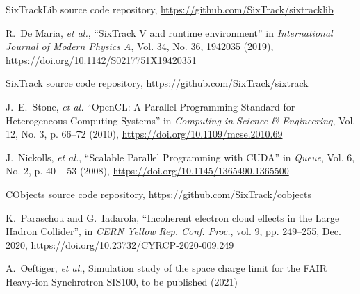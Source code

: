 \documentclass[a4paper,
               refpage,       %
               keeplastbox,   %
               ]{jacow}
\begin{document}

%
%
%
	{\printbibliography}%
	{%
	
	\begin{thebibliography}{99}   %
	
		SixTrackLib source code repository, \newline
		\url{https://github.com/SixTrack/sixtracklib}

        R.~De Maria,  {\it et al.}, ``SixTrack V and runtime environment'' in 
        \textit{International Journal of Modern Physics A}, Vol. 34, No. 36, 1942035 (2019), \newline
        \url{https://doi.org/10.1142/S0217751X19420351}

		SixTrack source code repository, \newline
		\url{https://github.com/SixTrack/sixtrack}
		
        J.~E.~Stone, {\it et al.} ``{OpenCL}: {{A Parallel Programming Standard}} for {{Heterogeneous Computing Systems}}'' in \textit{Computing in Science \& Engineering}, Vol. 12, No. 3, p. 66--72 (2010),  \newline
        \url{https://doi.org/10.1109/mcse.2010.69}
        
        J.~Nickolls, {\it et al.}, ``Scalable {{Parallel Programming}} with {{CUDA}}'' in 
        \textit{Queue}, Vol. 6, No. 2, p. 40 -- 53 (2008),  \newline
        \url{https://doi.org/10.1145/1365490.1365500}
        
        CObjects source code repository,  \newline
        \url{https://github.com/SixTrack/cobjects}
        
        K.~Paraschou and G.~Iadarola,
        ``Incoherent electron cloud effects in the Large Hadron Collider'', in
        \emph{CERN Yellow Rep. Conf. Proc.}, vol. 9, pp. 249--255, Dec. 2020, \newline
        \url{https://doi.org/10.23732/CYRCP-2020-009.249}
        
        A.~Oeftiger, {\it et al.}, Simulation study of the space charge limit for the FAIR Heavy-ion Synchrotron SIS100, to be published (2021)
        

\end{thebibliography}}
\end{document}
